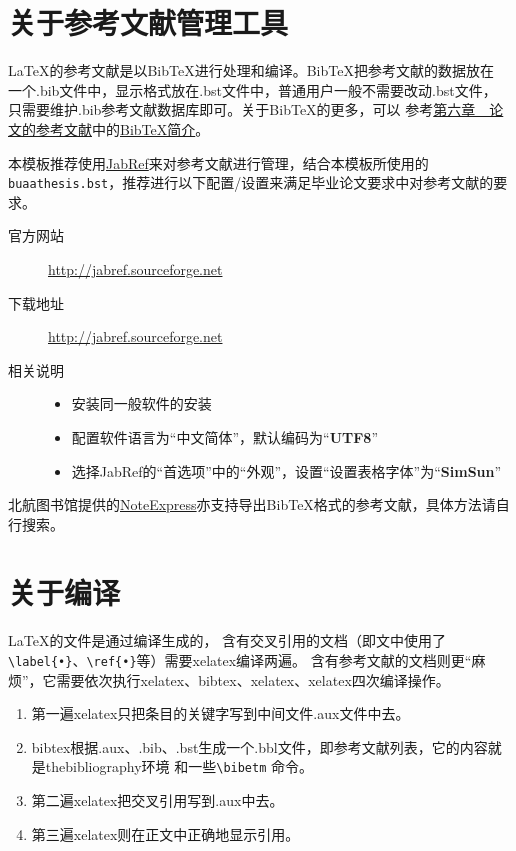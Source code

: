 \section{关于参考文献管理工具}
\LaTeX{}的参考文献是以Bib\TeX{}进行处理和编译。BibTeX把参考文献的数据放在
一个.bib文件中，显示格式放在.bst文件中，普通用户一般不需要改动.bst文件，
只需要维护.bib参考文献数据库即可。关于Bib\TeX{}的更多，可以
参考\hyperref[chapter-reference]{第六章~~论文的参考文献}中的\hyperref[section-bibtex]{Bib\TeX{}简介}。

本模板推荐使用\href{http://jabref.sourceforge.net}{JabRef}来对参考文献进行管理，结合本模板所使用的
\texttt{buaathesis.bst}，推荐进行以下配置/设置来满足毕业论文要求中对参考文献的要求。

\begin{description}
    \item[官方网站]
        \url{http://jabref.sourceforge.net}
    \item[下载地址]
        \url{http://jabref.sourceforge.net}
    \item[相关说明]
    \begin{itemize}
        \item 安装同一般软件的安装
        \item 配置软件语言为“中文简体”，默认编码为“\textbf{UTF8}”
        \item 选择JabRef的“首选项”中的“外观”，设置“设置表格字体”为“\textbf{SimSun}”
    \end{itemize}
\end{description}

北航图书馆提供的\href{http://edu.noteexpress.net/support/cgi-bin/download_sch.cgi?code=BeiHang}{NoteExpress}亦支持导出Bib\TeX{}格式的参考文献，具体方法请自行搜索。

\section{关于编译}

\LaTeX{}的文件是通过编译生成的，
含有交叉引用的文档（即文中使用了\verb|\label{•}|、\verb|\ref{•}|等）需要xelatex编译两遍。
含有参考文献的文档则更“麻烦”，它需要依次执行xelatex、bibtex、xelatex、xelatex四次编译操作。
\begin{enumerate}
\item 第一遍xelatex只把条目的关键字写到中间文件.aux文件中去。
\item bibtex根据.aux、.bib、.bst生成一个.bbl文件，即参考文献列表，它的内容就是thebibliography环境
和一些\verb|\bibetm| 命令。
\item 第二遍xelatex把交叉引用写到.aux中去。
\item 第三遍xelatex则在正文中正确地显示引用。
\end{enumerate}

